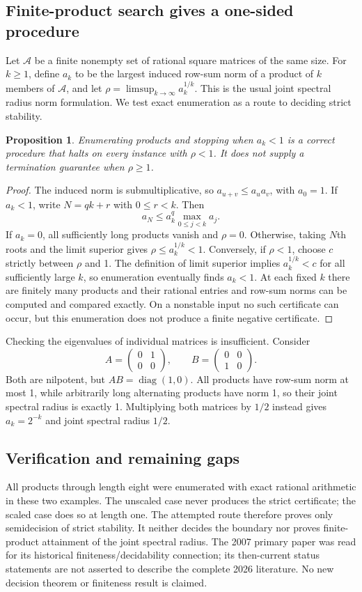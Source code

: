 \documentclass[11pt]{article}
\newtheorem{proposition}{Proposition}
\begin{document}
\subsection{Finite-product search gives a one-sided procedure}
Let $\mathcal A$ be a finite nonempty set of rational square matrices of the same size. For $k\ge1$, define $a_k$ to be the largest induced row-sum norm of a product of $k$ members of $\mathcal A$, and let $\rho=\limsup_{k\to\infty}a_k^{1/k}$. This is the usual joint spectral radius norm formulation. We test exact enumeration as a route to deciding strict stability.
\begin{proposition}
Enumerating products and stopping when $a_k<1$ is a correct procedure that halts on every instance with $\rho<1$. It does not supply a termination guarantee when $\rho\ge1$.
\end{proposition}
\begin{proof}
The induced norm is submultiplicative, so $a_{u+v}\le a_ua_v$, with $a_0=1$. If $a_k<1$, write $N=qk+r$ with $0\le r<k$. Then
\[
a_N\le a_k^q\max_{0\le j<k}a_j.
\]
If $a_k=0$, all sufficiently long products vanish and $\rho=0$. Otherwise, taking $N$th roots and the limit superior gives $\rho\le a_k^{1/k}<1$. Conversely, if $\rho<1$, choose $c$ strictly between $\rho$ and 1. The definition of limit superior implies $a_k^{1/k}<c$ for all sufficiently large $k$, so enumeration eventually finds $a_k<1$. At each fixed $k$ there are finitely many products and their rational entries and row-sum norms can be computed and compared exactly. On a nonstable input no such certificate can occur, but this enumeration does not produce a finite negative certificate.
\end{proof}
Checking the eigenvalues of individual matrices is insufficient. Consider
\[
A=\begin{pmatrix}0&1\\0&0\end{pmatrix},\qquad
B=\begin{pmatrix}0&0\\1&0\end{pmatrix}.
\]
Both are nilpotent, but $AB=\operatorname{diag}(1,0)$. All products have row-sum norm at most 1, while arbitrarily long alternating products have norm 1, so their joint spectral radius is exactly 1. Multiplying both matrices by $1/2$ instead gives $a_k=2^{-k}$ and joint spectral radius $1/2$.
\subsection{Verification and remaining gaps}
All products through length eight were enumerated with exact rational arithmetic in these two examples. The unscaled case never produces the strict certificate; the scaled case does so at length one. The attempted route therefore proves only semidecision of strict stability. It neither decides the boundary nor proves finite-product attainment of the joint spectral radius. The 2007 primary paper was read for its historical finiteness/decidability connection; its then-current status statements are not asserted to describe the complete 2026 literature. No new decision theorem or finiteness result is claimed.
\end{document}
